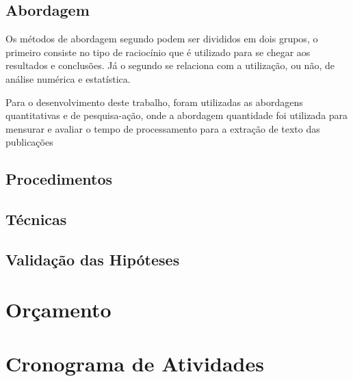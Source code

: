 \subsection{Abordagem}

Os métodos de abordagem segundo \citep[p. 29]{LOVATO:metodologia} podem ser
divididos em dois grupos, o primeiro consiste no tipo de raciocínio que
é utilizado para se chegar aos resultados e conclusões. Já o segundo
se relaciona com a utilização, ou não, de análise numérica e estatística.

Para o desenvolvimento deste trabalho, foram utilizadas as abordagens
quantitativas e de pesquisa-ação, onde a abordagem quantidade foi utilizada
para mensurar e avaliar o tempo de processamento para a extração de texto
das publicações

\subsection{Procedimentos}



\subsection{Técnicas}

\subsection{Validação das Hipóteses}


\section{Orçamento} \label{sec:budget}


\section{Cronograma de Atividades} \label{sec:schedule_activities_table}

